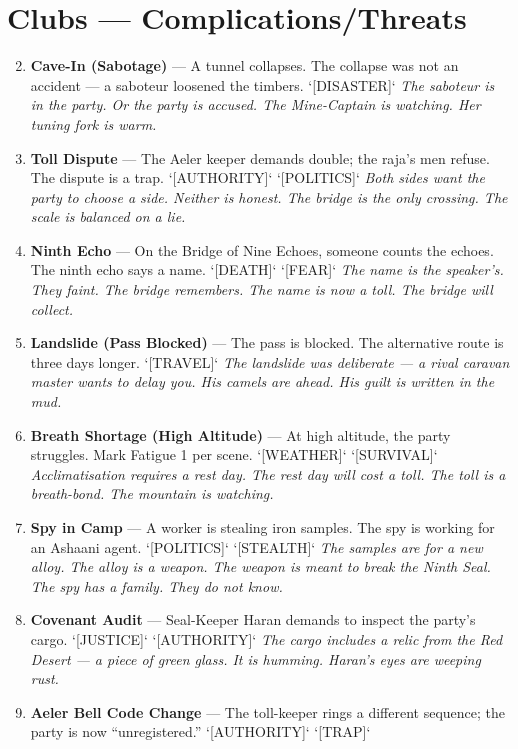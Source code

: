 \section*{Clubs --- Complications/Threats}
\label{sec:himadri-complications}
\begin{enumerate}
\setcounter{enumi}{1}
\item \textbf{Cave-In (Sabotage)} --- A tunnel collapses. The collapse was not an accident — a saboteur loosened the timbers. `[DISASTER]`
  \hfill \textit{The saboteur is in the party. Or the party is accused. The Mine-Captain is watching. Her tuning fork is warm.}
\item \textbf{Toll Dispute} --- The Aeler keeper demands double; the raja's men refuse. The dispute is a trap. `[AUTHORITY]` `[POLITICS]`
  \hfill \textit{Both sides want the party to choose a side. Neither is honest. The bridge is the only crossing. The scale is balanced on a lie.}
\item \textbf{Ninth Echo} --- On the Bridge of Nine Echoes, someone counts the echoes. The ninth echo says a name. `[DEATH]` `[FEAR]`
  \hfill \textit{The name is the speaker's. They faint. The bridge remembers. The name is now a toll. The bridge will collect.}
\item \textbf{Landslide (Pass Blocked)} --- The pass is blocked. The alternative route is three days longer. `[TRAVEL]`
  \hfill \textit{The landslide was deliberate — a rival caravan master wants to delay you. His camels are ahead. His guilt is written in the mud.}
\item \textbf{Breath Shortage (High Altitude)} --- At high altitude, the party struggles. Mark Fatigue 1 per scene. `[WEATHER]` `[SURVIVAL]`
  \hfill \textit{Acclimatisation requires a rest day. The rest day will cost a toll. The toll is a breath-bond. The mountain is watching.}
\item \textbf{Spy in Camp} --- A worker is stealing iron samples. The spy is working for an Ashaani agent. `[POLITICS]` `[STEALTH]`
  \hfill \textit{The samples are for a new alloy. The alloy is a weapon. The weapon is meant to break the Ninth Seal. The spy has a family. They do not know.}
\item \textbf{Covenant Audit} --- Seal-Keeper Haran demands to inspect the party's cargo. `[JUSTICE]` `[AUTHORITY]`
  \hfill \textit{The cargo includes a relic from the Red Desert — a piece of green glass. It is humming. Haran's eyes are weeping rust.}
\item \textbf{Aeler Bell Code Change} --- The toll-keeper rings a different sequence; the party is now ``unregistered.'' `[AUTHORITY]` `[TRAP]`

\end{enumerate}
